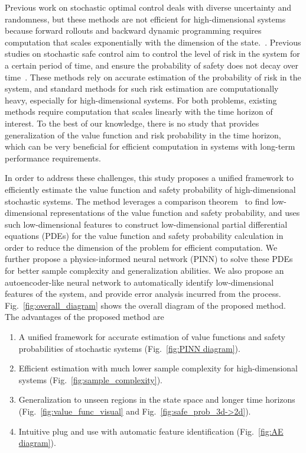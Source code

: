 \documentclass[letterpaper]{article} %
\newcommand{\resolved}[1]{}
\begin{document}
Previous work on stochastic optimal control deals with diverse uncertainty and randomness, but these methods are not efficient for high-dimensional systems because forward rollouts and backward dynamic programming requires computation that scales exponentially with the dimension of the state.~\cite{gorodetsky2018high, frankowska2020necessary}\resolved{to elaborate}.
Previous studies on stochastic safe control aim to control the level of risk in the system for a certain period of time, and ensure the probability of safety does not decay over time~\cite{samuelson2018safety,gomez2016real}.
These methods rely on accurate estimation of the probability of risk in the system, and standard methods for such risk estimation are computationally heavy, especially for high-dimensional systems.
For both problems, existing methods require computation that scales linearly with the time horizon of interest. To the best of our knowledge, there is no study that provides generalization of the value function and risk probability in the time horizon, which can be very beneficial for efficient computation in systems with long-term performance requirements.

In order to address these challenges, this study proposes a unified framework to efficiently estimate the value function and safety probability of high-dimensional stochastic systems. The method leverages a comparison theorem~\cite{10.1215/kjm/1250523321} to find low-dimensional representations of the value function and safety probability, and uses such low-dimensional features to construct low-dimensional partial differential equations (PDEs) for the value function and safety probability calculation in order to reduce the dimension of the problem for efficient computation.
We further propose a physics-informed neural network (PINN) to solve these PDEs for better sample complexity and generalization abilities.
We also propose an autoencoder-like neural network to automatically identify low-dimensional features of the system, and provide error analysis incurred from the process.
Fig.~\ref{fig:overall_diagram} shows the overall diagram of the proposed method. 
The advantages of the proposed method are
\begin{enumerate}
    \item A unified framework for accurate estimation of value functions and safety probabilities of stochastic systems (Fig.~\ref{fig:PINN diagram}). 
    \item Efficient estimation with much lower sample complexity for high-dimensional systems (Fig.~\ref{fig:sample_complexity}).
    \item Generalization to unseen regions in the state space and longer time horizons (Fig.~\ref{fig:value_func_visual} and Fig.~\ref{fig:safe_prob_3d->2d}).
    \item Intuitive plug and use with automatic feature identification (Fig.~\ref{fig:AE diagram}).
\end{enumerate}
\end{document}
